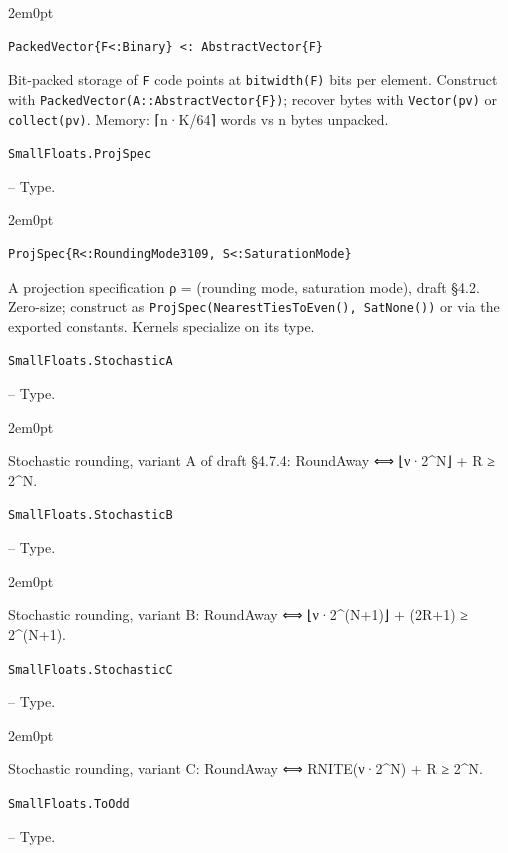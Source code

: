 \begin{adjustwidth}{2em}{0pt}


\begin{verbatim}
PackedVector{F<:Binary} <: AbstractVector{F}
\end{verbatim}

Bit-packed storage of \texttt{F} code points at \texttt{bitwidth(F)} bits per element. Construct with \texttt{PackedVector(A::AbstractVector\{F\})}; recover bytes with \texttt{Vector(pv)} or \texttt{collect(pv)}. Memory: ⌈n·K/64⌉ words vs n bytes unpacked.



\end{adjustwidth}
\hypertarget{3971740801855465015}{\texttt{SmallFloats.ProjSpec}}  -- {Type.}

\begin{adjustwidth}{2em}{0pt}


\begin{verbatim}
ProjSpec{R<:RoundingMode3109, S<:SaturationMode}
\end{verbatim}

A projection specification ρ = (rounding mode, saturation mode), draft §4.2. Zero-size; construct as \texttt{ProjSpec(NearestTiesToEven(), SatNone())} or via the exported constants. Kernels specialize on its type.



\end{adjustwidth}
\hypertarget{5642129125365414505}{\texttt{SmallFloats.StochasticA}}  -- {Type.}

\begin{adjustwidth}{2em}{0pt}

Stochastic rounding, variant A of draft §4.7.4: RoundAway ⟺ ⌊ν·2{\textasciicircum}N⌋ + R ≥ 2{\textasciicircum}N.



\end{adjustwidth}
\hypertarget{15839936377740889884}{\texttt{SmallFloats.StochasticB}}  -- {Type.}

\begin{adjustwidth}{2em}{0pt}

Stochastic rounding, variant B: RoundAway ⟺ ⌊ν·2{\textasciicircum}(N+1)⌋ + (2R+1) ≥ 2{\textasciicircum}(N+1).



\end{adjustwidth}
\hypertarget{11520338016165756811}{\texttt{SmallFloats.StochasticC}}  -- {Type.}

\begin{adjustwidth}{2em}{0pt}

Stochastic rounding, variant C: RoundAway ⟺ RNITE(ν·2{\textasciicircum}N) + R ≥ 2{\textasciicircum}N.



\end{adjustwidth}
\hypertarget{11439938397858131910}{\texttt{SmallFloats.ToOdd}}  -- {Type.}

